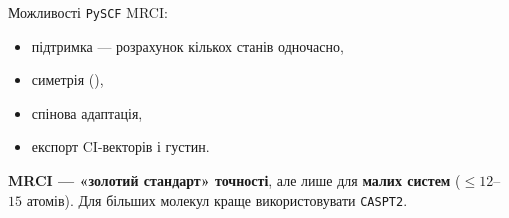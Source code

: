 Можливості \texttt{PySCF} MRCI:
\begin{itemize}
    \item підтримка  --- розрахунок кількох станів одночасно,
    \item симетрія (),
    \item спінова адаптація,
    \item експорт CI-векторів і густин.
\end{itemize}


\begin{commentbox}
\textbf{MRCI --- «золотий стандарт» точності}, але лише для \textbf{малих систем} ($\leq 12$--$15$ атомів).
Для більших молекул краще використовувати \texttt{CASPT2}.
\end{commentbox}
